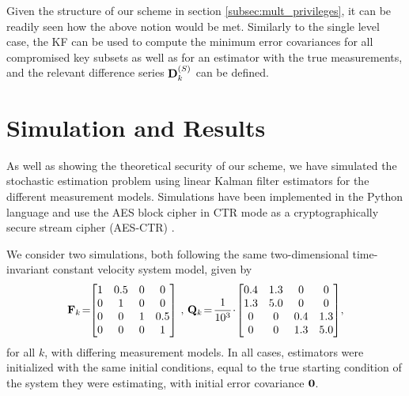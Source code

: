 \documentclass[letterpaper, 10 pt, conference]{ieeeconf}
\begin{document}
Given the structure of our scheme in section \ref{subsec:mult_privileges}, it can be readily seen how the above notion would be met. Similarly to the single level case, the KF can be used to compute the minimum error covariances for all compromised key subsets as well as for an estimator with the true measurements, and the relevant difference series ${{\mathbf{D}}}^{(S)}_k$ can be defined. 

% 
%                                                     
% 

\addtolength{\textheight}{-0.074cm}

% 
%                                 
%                                 
%                                 
% 

\section{Simulation and Results}\label{sec:simulation}
As well as showing the theoretical security of our scheme, we have simulated the stochastic estimation problem using linear Kalman filter estimators for the different measurement models. Simulations have been implemented in the Python language and use the AES block cipher in CTR mode as a cryptographically secure stream cipher (AES-CTR) \cite{gueronIntelAdvancedEncryption2010}.

We consider two simulations, both following the same two-dimensional time-invariant constant velocity system model, given by
\begin{equation*}
   \mat{F}_k\! = \!\!
   \begin{bmatrix}
      1 & 0.5 & 0 & 0\\
      0 & 1 & 0 & 0\\
      0 & 0 & 1 & 0.5\\
      0 & 0 & 0 & 1
   \end{bmatrix}\,,\,
   \mat{Q}_k\! = \!\frac{1}{10^3}\!\cdot\!
   \begin{bmatrix}
      0.4 & 1.3 & 0 & 0\\
      1.3 & 5.0 & 0 & 0\\
      0 & 0 & 0.4 & 1.3\\
      0 & 0 & 1.3 & 5.0
   \end{bmatrix}\!,
\end{equation*}
for all $k$, with differing measurement models. In all cases, estimators were initialized with the same initial conditions, equal to the true starting condition of the system they were estimating, with initial error covariance ${{\mathbf{0}}}$.
\end{document}

